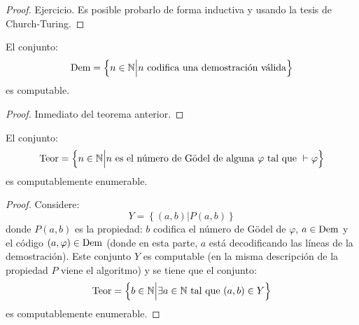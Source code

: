 \documentclass[12pt]{report}
\newcounter{it}
\theoremstyle{largebreak}
\begin{document}
    \begin{proof}
        Ejercicio. Es posible probarlo de forma inductiva y usando la tesis de Church-Turing.
    \end{proof}

    \begin{cor}
        El conjunto:
        \begin{equation*}
            \textup{Dem}=\left\{n\in\mathbb{N}\Big|n\textup{ codifica una demostración válida} \right\}
        \end{equation*}
        es computable.
    \end{cor}

    \begin{proof}
        Inmediato del teorema anterior.
    \end{proof}

    \begin{cor}
        El conjunto:
        \begin{equation*}
            \textup{Teor}=\left\{n\in\mathbb{N}\Big|n\textup{ es el número de Gödel de alguna }\varphi\textup{ tal que }\vdash\varphi \right\}
        \end{equation*}
        es computablemente enumerable.
    \end{cor}

    \begin{proof}
        Considere:
        \begin{equation*}
            Y=\left\{(a,b)\Big| P(a,b) \right\}
        \end{equation*}
        donde $P(a,b)$ es la propiedad: $b$ codifica el número de Gödel de $\varphi$, $a\in\textup{Dem}$ y el código $(a,\varphi)\in\textup{Dem}$ (donde en esta parte, $a$ está decodificando las líneas de la demostración). Este conjunto $Y$ es computable (en la misma descripción de la propiedad $P$ viene el algoritmo) y se tiene que el conjunto:
        \begin{equation*}
            \textup{Teor}=\left\{b\in\mathbb{N}\Big|\exists a\in\mathbb{N}\textup{ tal que }(a,b)\in Y \right\}
        \end{equation*}
        es computablemente enumerable.
    \end{proof}
\end{document}
